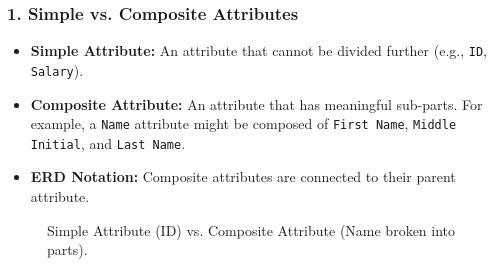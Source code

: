 \documentclass[12pt,a4paper]{article}
\begin{document}
\subsubsection{1. Simple vs. Composite Attributes}
\begin{itemize}
    \item \textbf{Simple Attribute:} An attribute that cannot be divided further (e.g., \texttt{ID}, \texttt{Salary}).
    \item \textbf{Composite Attribute:} An attribute that has meaningful sub-parts. For example, a \texttt{Name} attribute might be composed of \texttt{First Name}, \texttt{Middle Initial}, and \texttt{Last Name}.
    \item \textbf{ERD Notation:} Composite attributes are connected to their parent attribute.
\end{itemize}
\begin{figure}[H]
    \centering
    \caption{Simple Attribute (ID) vs. Composite Attribute (Name broken into parts).}
\end{figure}
\end{document}
